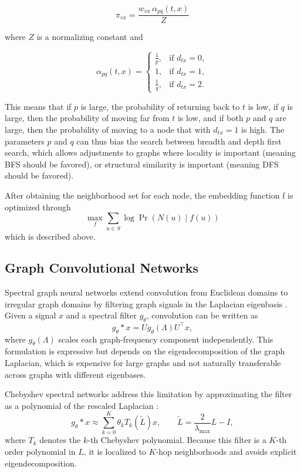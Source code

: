 \documentclass[11pt]{article}
\begin{document}
\[
\pi_{vx}
=
\frac{w_{vx}\,\alpha_{pq}(t,x)}{Z}
\]

where \(Z\) is a normalizing constant and

\[
\alpha_{pq}(t,x)
=
\begin{cases}
\frac{1}{p}, & \text{if } d_{tx}=0, \\
1, & \text{if } d_{tx}=1, \\
\frac{1}{q}, & \text{if } d_{tx}=2.
\end{cases}
\]

This means that if $p$ is large, the probability of returning back to $t$ is low, if $q$ is large, then the probability of moving far from $t$ is low, and if both $p$ and $q$ are large, then the probability of moving to a node that with $d_{tx} = 1$ is high. The parameters $p$ and $q$ can thus bias the search between breadth and depth first search, which allows adjustments to graphs where locality is important (meaning BFS should be favored), or structural similarity is important (meaning DFS should be favored).

After obtaining the neighborhood set for each node, the embedding function f is optimized through     
    \[
    \max_f \sum_{u\in{S}} \log \Pr\left(N(u)\mid f(u)\right)
    \]
which is described above.



\subsection{Graph Convolutional Networks}
Spectral graph neural networks extend convolution from Euclidean domains to irregular graph domains by filtering graph signals in the Laplacian eigenbasis \cite{bruna2014spectral,defferrard2016convolutional,kipf2017semi}. Given a signal $x$ and a spectral filter $g_\theta$, convolution can be written as
\[
    g_\theta * x
    = U g_\theta(\Lambda) U^\top x,
\]
where $g_\theta(\Lambda)$ scales each graph-frequency component independently. This formulation is expressive but depends on the eigendecomposition of the graph Laplacian, which is expensive for large graphs and not naturally transferable across graphs with different eigenbases.

Chebyshev spectral networks address this limitation by approximating the filter as a polynomial of the rescaled Laplacian \cite{defferrard2016convolutional}:
\[
    g_\theta * x
    \approx \sum_{k=0}^{K} \theta_k T_k(\widetilde{L})x,
    \qquad
    \widetilde{L} = \frac{2}{\lambda_{\max}}L - I,
\]
where $T_k$ denotes the $k$-th Chebyshev polynomial. Because this filter is a $K$-th order polynomial in $L$, it is localized to $K$-hop neighborhoods and avoids explicit eigendecomposition.
\end{document}
